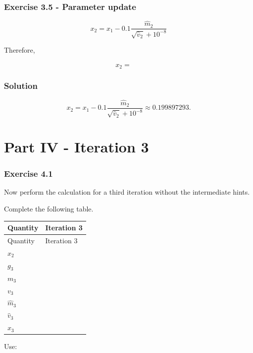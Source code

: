 \documentclass[10pt]{article}
\begin{document}
\par\endgroup

\subsubsection*{Exercise 3.5 - Parameter update}
\[
x_2 =
x_1 -
0.1
\frac{\hat m_2}
{\sqrt{\hat v_2}+10^{-8}}
\]

Therefore,

\[
x_2 = {\phantom{000}}
\]

\begingroup\color{red}

\subsubsection*{Solution}
\[
x_2=x_1-0.1\frac{\hat m_2}{\sqrt{\hat v_2}+10^{-8}}\approx0.199897293.
\]

\par\endgroup

\clearpage
\section*{Part IV - Iteration 3}
\subsubsection*{Exercise 4.1}
Now perform the calculation for a third iteration without the intermediate hints.

Complete the following table.

\begingroup
\small
\setlength{\tabcolsep}{4pt}
\begin{longtable}{l|l}
Quantity & Iteration 3 \\[1.5pt]
\hline
\endfirsthead
Quantity & Iteration 3 \\[1.5pt]
\hline
\endhead
\rule{0pt}{2.4ex}$x_2$ &  $\phantom{-0.00}$ \\[3pt]
\rule{0pt}{2.4ex}$g_3$ &  $\phantom{-0.00}$ \\[3pt]
\rule{0pt}{2.4ex}$m_3$ &  $\phantom{-0.00}$ \\[3pt]
\rule{0pt}{2.4ex}$v_3$ &  $\phantom{-0.00}$ \\[3pt]
\rule{0pt}{2.4ex}$\hat m_3$ &  $\phantom{-0.00}$ \\[3pt]
\rule{0pt}{2.4ex}$\hat v_3$ &  $\phantom{-0.00}$ \\[3pt]
\rule{0pt}{2.4ex}$x_3$ &  $\phantom{-0.00}$ \\[3pt]
\end{longtable}
\endgroup
Use:
\end{document}
